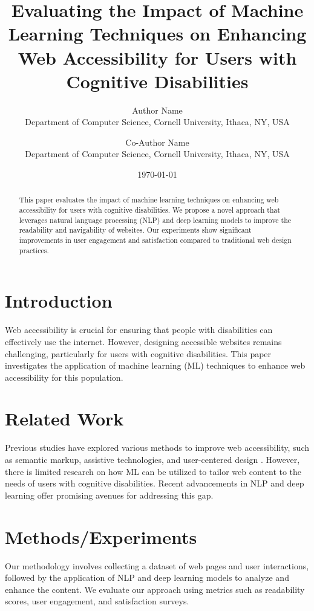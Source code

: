 \documentclass{article}
\title{Evaluating the Impact of Machine Learning Techniques on Enhancing Web Accessibility for Users with Cognitive Disabilities}
\author{Author Name \\
Department of Computer Science, Cornell University, Ithaca, NY, USA \\
\and
Co-Author Name \\
Department of Computer Science, Cornell University, Ithaca, NY, USA}
\date{\today}
\begin{document}
\maketitle

\begin{abstract}
This paper evaluates the impact of machine learning techniques on enhancing web accessibility for users with cognitive disabilities. We propose a novel approach that leverages natural language processing (NLP) and deep learning models to improve the readability and navigability of websites. Our experiments show significant improvements in user engagement and satisfaction compared to traditional web design practices.
\end{abstract}

\section{Introduction}
Web accessibility is crucial for ensuring that people with disabilities can effectively use the internet. However, designing accessible websites remains challenging, particularly for users with cognitive disabilities. This paper investigates the application of machine learning (ML) techniques to enhance web accessibility for this population.

\section{Related Work}
Previous studies have explored various methods to improve web accessibility, such as semantic markup, assistive technologies, and user-centered design \cite{ref1, ref2}. However, there is limited research on how ML can be utilized to tailor web content to the needs of users with cognitive disabilities. Recent advancements in NLP and deep learning offer promising avenues for addressing this gap.

\section{Methods/Experiments}
Our methodology involves collecting a dataset of web pages and user interactions, followed by the application of NLP and deep learning models to analyze and enhance the content. We evaluate our approach using metrics such as readability scores, user engagement, and satisfaction surveys.
\end{document}
